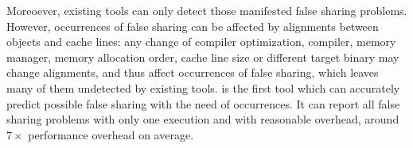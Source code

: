 Moreoever, existing tools can only detect those manifested false sharing problems.
However, occurrences of false sharing can be affected by alignments between
objects and cache lines: any change of compiler optimization, compiler, memory manager, 
memory allocation order, cache line size or different target binary 
may change alignments, and thus affect occurrences of false sharing, 
which leaves many of them undetected by existing tools.
\Predator{} is the first tool which can accurately predict possible false sharing 
with the need of occurrences. 
It can report all false sharing problems with only one execution and with reasonable overhead, 
around $7\times$ performance overhead on average.

